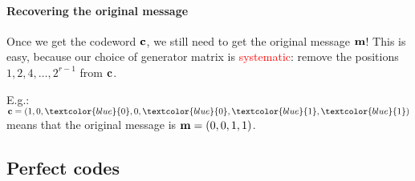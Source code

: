 \documentclass[a4paper, 11pt, openany]{book}
\numberwithin{equation}{section}
\theoremstyle{plain}
\theoremstyle{definition}
\newcommand{\Important}[1]{\textcolor{red}{#1}}
\newcommand{\Structure}[1]{\textcolor{blue}{#1}}
\begin{document}
\paragraph{Recovering the original message}
Once we get the codeword ${\bf c}$, we still need to get the original message ${\bf m}$! This is easy, because our choice of generator matrix is \Important{systematic}: remove the positions $1,2, 4, \ldots, 2^{r-1}$ from ${\bf c}$.

E.g.: ${\bf c} = (1,0,\Structure{0},0,\Structure{0},\Structure{1},\Structure{1})$ means that the original message is ${\bf m} = (0,0,1,1)$.



\subsection{Perfect codes}
\end{document}
